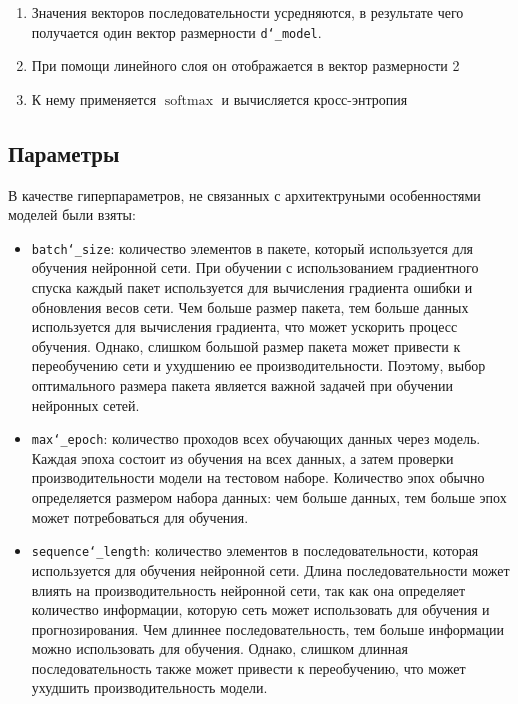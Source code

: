 \documentclass[diploma]{nanolab2015}
\DeclareMathOperator{\softmax}{softmax}
\begin{document}
\begin{enumerate}
    \item Значения векторов последовательности усредняются, в результате чего получается один вектор размерности \texttt{d\char`_model}.
    \item При помощи линейного слоя он отображается в вектор размерности 2
    \item К нему применяется $\softmax$ и вычисляется кросс-энтропия
\end{enumerate}

\subsection{Параметры}
В качестве гиперпараметров, не связанных с архитектруными особенностями моделей были взяты:
\begin{itemize}
    \item \texttt{batch\char`_size}: количество элементов в пакете, который используется для обучения нейронной сети. При обучении с использованием градиентного спуска каждый пакет используется для вычисления градиента ошибки и обновления весов сети. Чем больше размер пакета, тем больше данных используется для вычисления градиента, что может ускорить процесс обучения. Однако, слишком большой размер пакета может привести к переобучению сети и ухудшению ее производительности. Поэтому, выбор оптимального размера пакета является важной задачей при обучении нейронных сетей.
    \item \texttt{max\char`_epoch}: количество проходов всех обучающих данных через модель. Каждая эпоха состоит из обучения на всех данных, а затем проверки производительности модели на тестовом наборе. Количество эпох обычно определяется размером набора данных: чем больше данных, тем больше эпох может потребоваться для обучения.
    \item \texttt{sequence\char`_length}: количество элементов в последовательности, которая используется для обучения нейронной сети. Длина последовательности может влиять на производительность нейронной сети, так как она определяет количество информации, которую сеть может использовать для обучения и прогнозирования. Чем длиннее последовательность, тем больше информации можно использовать для обучения. Однако, слишком длинная последовательность также может привести к переобучению, что может ухудшить производительность модели.
\end{itemize}
\end{document}
